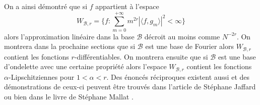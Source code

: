 On a ainsi démontré que si $f$ appartient à l'espace
\begin{equation}
	W_{\mathcal{B}, r} =\{f : \sum_{m=0}^{+\infty} m^{2r} |\langle f, g_m \rangle |^2 < \infty\}
\end{equation}
alors l'approximation linéaire dans la base $\mathcal{B}$ décroit au moins comme $N^{-2r}$.
On montrera dans la prochaine sections que si $\mathcal{B}$ est une base de Fourier alors $W_{\mathcal{B}, r}$ contient les fonctions $r$-différentiables. 
On montrera ensuite que si $\mathcal{B}$ est une base d'ondelette avec une certaine propriété alors l'espace $W_{\mathcal{B}, r}$ contient les fonctions $\alpha$-Lipschitziennes pour $1 < \alpha < r$.
Des énoncés réciproques existent aussi et des démonstrations de ceux-ci peuvent être trouvés dans l'article de Stéphane Jaffard \cite{jaffard} ou bien dans le livre de Stéphane Mallat \cite{mallatbook}.
